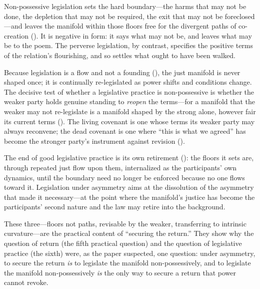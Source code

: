  Non-possessive legislation sets the hard boundary---the harms that may not be done, the depletion that may not be required, the exit that may not be foreclosed---and leaves the manifold within those floors free for the divergent paths of co-creation (). It is negative in form: it says what may not be, and leaves what may be to the poem. The perverse legislation, by contrast, specifies the positive terms of the relation's flourishing, and so settles what ought to have been walked. 

 Because legislation is a flow and not a founding (), the just manifold is never shaped once; it is continually re-legislated as power shifts and conditions change. The decisive test of whether a legislative practice is non-possessive is whether the weaker party holds genuine standing to \emph{reopen} the terms---for a manifold that the weaker may not re-legislate is a manifold shaped by the strong alone, however fair its current terms (). The living covenant is one whose terms its weaker party may always reconvene; the dead covenant is one where ``this is what we agreed'' has become the stronger party's instrument against revision ().

 The end of good legislative practice is its own retirement (): the floors it sets are, through repeated just flow upon them, internalized as the participants' own dynamics, until the boundary need no longer be enforced because no one flows toward it. Legislation under asymmetry aims at the dissolution of the asymmetry that made it necessary---at the point where the manifold's justice has become the participants' second nature and the law may retire into the background. 

These three---floors not paths, revisable by the weaker, transferring to intrinsic curvature---are the practical content of ``securing the return.'' They show why the question of return (the fifth practical question) and the question of legislative practice (the sixth) were, as the paper suspected, one question: under asymmetry, to secure the return \emph{is} to legislate the manifold non-possessively, and to legislate the manifold non-possessively \emph{is} the only way to secure a return that power cannot revoke.

